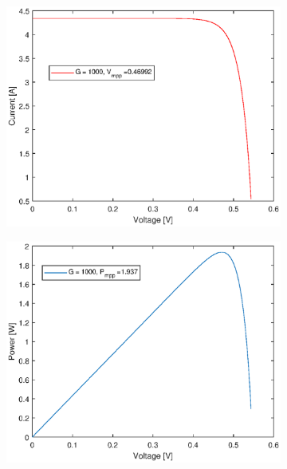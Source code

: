 		\begin{figure}[H]		
		\begin{center}
			\begin{subfigure}{0.4\textwidth}
				\begin{center}
					\includegraphics[width=1\textwidth]{figures/vg1000.eps}
				\end{center}	
			\end{subfigure}
			\begin{subfigure}{0.4\textwidth}
				\begin{center}
					\includegraphics[width=1\textwidth]{figures/pg1000.eps}

\end{center}
\end{subfigure}
\end{center}
\end{figure}
